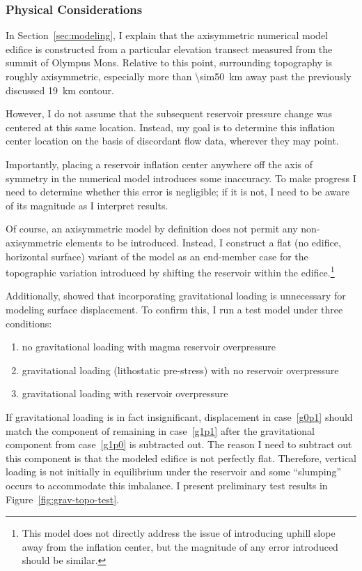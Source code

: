 \subsubsection{Physical Considerations}

In Section~\ref{sec:modeling}, I explain that the axisymmetric numerical model edifice is constructed from a particular elevation transect measured from the summit of Olympus Mons. Relative to this point, surrounding topography is roughly axisymmetric, especially more than \qty{\sim50}{\km} away past the previously discussed \qty{19}{\km} contour.

However, I do not assume that the subsequent reservoir pressure change was centered at this same location. Instead, my goal is to  determine this inflation center location on the basis of discordant flow data, wherever they may point.

Importantly, placing a reservoir inflation center anywhere off the axis of symmetry in the numerical model introduces some inaccuracy. To make progress I need to determine whether this error is negligible; if it is not, I need to be aware of its magnitude as I interpret results.

Of course, an axisymmetric model by definition does not permit any non-axisymmetric elements to be introduced. Instead, I construct a flat (no edifice, horizontal surface) variant of the model as an end-member case for the topographic variation introduced by shifting the reservoir within the edifice.\footnote{This model does not directly address the issue of introducing uphill slope away from the inflation center, but the magnitude of any error introduced should be similar.}

Additionally, \textcite{grosfils_magma_2007} showed that incorporating gravitational loading is unnecessary for modeling surface displacement. To confirm this, I run a test model under three conditions:
\begin{enumerate}
    \item no gravitational loading with magma reservoir overpressure \label{g0p1}
    \item gravitational loading (lithostatic pre-stress) with no reservoir overpressure\label{g1p0}
    \item gravitational loading with reservoir overpressure \label{g1p1}
\end{enumerate}
If gravitational loading is in fact insignificant, displacement in case~\ref{g0p1} should match the component of remaining in case~\ref{g1p1} after the gravitational component from case~\ref{g1p0} is subtracted out. The reason I need to subtract out this component is that the modeled edifice is not perfectly flat. Therefore, vertical loading is not initially in equilibrium under the reservoir and some ``slumping'' occurs to accommodate this imbalance. I present preliminary test results in Figure~\ref{fig:grav-topo-test}.

